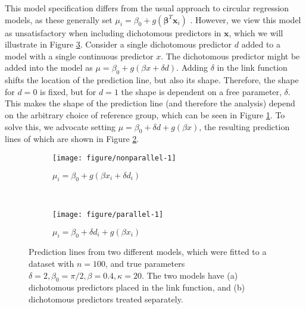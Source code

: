 \documentclass[11pt,a4paper]{article}\usepackage[]{graphicx}\usepackage[]{color}
\makeatletter
\def\maxwidth{ %
  \ifdim\Gin@nat@width>\linewidth
    \linewidth
  \else
    \Gin@nat@width
  \fi
}
\newenvironment{knitrout}{}{} %
\newcommand{\bx}{\boldsymbol{x}}
\newcommand{\bbt}{\boldsymbol{\beta}}
\makeatother
\begin{document}
This model specification differs from the usual approach to circular regression models, as these generally set \( \mu_i = \beta_0 + g(\bbt^T \bx_i)\) \citep{fisher1992regression, gill2010, lagona2016regression}. However, we view this model as unsatisfactory when including dichotomous predictors in \( \bx \), which we will illustrate in Figure \ref{parallelnonparallel}. Consider a single dichotomous predictor \( d \) added to a model with a single continuous predictor \( x \). The dichotomous predictor might be added into the model as \( \mu = \beta_0 + g(\beta x + \delta d ) \). Adding \( \delta \) in the link function shifts the location of the prediction line, but also its shape. Therefore, the shape for \( d = 0 \) is fixed, but for \( d = 1 \) the shape is dependent on a free parameter, \( \delta \). This makes the shape of the prediction line (and therefore the analysis) depend on the arbitrary choice of reference group, which can be seen in Figure \ref{nonparallel}. To solve this, we advocate setting \( \mu = \beta_0 + \delta d + g(\beta x ) \), the resulting prediction lines of which are shown in Figure \ref{parallel}.

\begin{figure}

\begin{subfigure}[b]{0.5\textwidth}



\begin{knitrout}
\color{fgcolor}
\texttt{[image: figure/nonparallel-1]} 

\end{knitrout}
\caption{$\mu_i = \beta_0 + g(\beta x_i  + \delta d_i)$}
\label{nonparallel}
\end{subfigure}
~
\begin{subfigure}[b]{0.5\textwidth}
\begin{knitrout}
\color{fgcolor}
\texttt{[image: figure/parallel-1]} 

\end{knitrout}
\caption{$\mu_i = \beta_0  + \delta d_i + g(\beta x_i)$}
\label{parallel}
\end{subfigure}

\caption{Prediction lines from two different models, which were fitted to a dataset with $n = 100$, and true parameters $\delta = 2, \beta_0 = \pi/2, \beta = 0.4, \kappa = 20$. The two models have (a) dichotomous predictors placed in the link function, and (b) dichotomous predictors treated separately.}
\label{parallelnonparallel}
\end{figure}
\end{document}
